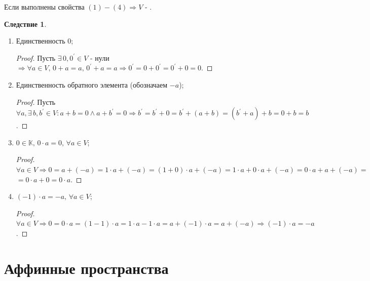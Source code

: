 \documentclass[12pt]{article}
\theoremstyle{definition}
\newtheorem{corollary}{Следствие}
\begin{document}
Если выполнены свойства $(1)-(4) \Rightarrow V$ - .

\begin{corollary}\hfill
	\begin{enumerate}
		\item Единственность $0$;
		\begin{proof}
			Пусть $\exists \, 0, 0^\prime \in V$ - нули $\Rightarrow \forall a\in V,\, 0 + a = a, \, 0^\prime + a = a \Rightarrow 0^\prime = 0 + 0^\prime = 0^\prime + 0 = 0$.
		\end{proof}
		\item Единственность обратного элемента (обозначаем $-a$);
		\begin{proof}
			Пусть $\forall a, \exists \, b, b^\prime \in V \colon a + b = 0 \wedge a + b^\prime = 0 \Rightarrow b^\prime = b^\prime + 0 = b^\prime + (a + b) = (b^\prime + a) + b = 0 + b = b$.
		\end{proof}
		\item $0 \in \mathbb{K}, \, 0{\cdot}a = 0, \, \forall a \in V$;
		\begin{proof}
			$\forall a \in V \Rightarrow 0 = a + (-a) = 1{\cdot}a + (-a) = (1 + 0){\cdot}a +(-a) = 1{\cdot}a + 0{\cdot}a + (-a) = 0{\cdot}a + a + (-a) = $\\
			$= 0{\cdot}a + 0 = 0{\cdot}a$.
		\end{proof}
	\newpage
		\item $(-1){\cdot}a = -a, \, \forall a \in V$;
		\begin{proof}
			$\forall a \in V \Rightarrow 0 = 0{\cdot}a = (1-1){\cdot}a = 1{\cdot}a - 1{\cdot}a = a + (-1){\cdot}a = a + (-a) \Rightarrow (-1){\cdot}a = -a$.
		\end{proof}
	\end{enumerate}
\end{corollary}

\section*{Аффинные пространства}
\end{document}
